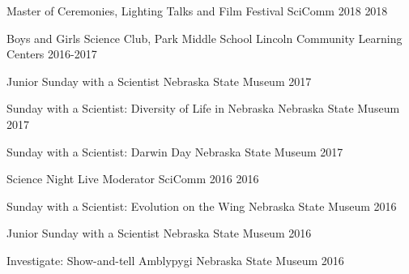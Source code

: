 

\begin{cvoutreaches}

 \cvoutreach
    {Master of Ceremonies, Lighting Talks and Film Festival}
    {SciComm 2018}
    {2018}
     
  \cvoutreach
    {Boys and Girls Science Club, Park Middle School}
    {Lincoln Community Learning Centers}
    {2016-2017}
    
  \cvoutreach
    {Junior Sunday with a Scientist}
    {Nebraska State Museum}
    {2017}
    
   \cvoutreach
     {Sunday with a Scientist: Diversity of Life in Nebraska}
     {Nebraska State Museum}
     {2017}
     
   \cvoutreach
     {Sunday with a Scientist: Darwin Day}
     {Nebraska State Museum}
     {2017}
     
   \cvoutreach
     {Science Night Live Moderator}
     {SciComm 2016}
     {2016}
 
   \cvoutreach
     {Sunday with a Scientist: Evolution on the Wing}
     {Nebraska State Museum}
     {2016}
     
   \cvoutreach
     {Junior Sunday with a Scientist}
     {Nebraska State Museum}
     {2016}
     
   \cvoutreach
     {Investigate: Show-and-tell Amblypygi}
     {Nebraska State Museum}
     {2016}
     
\end{cvoutreaches}

